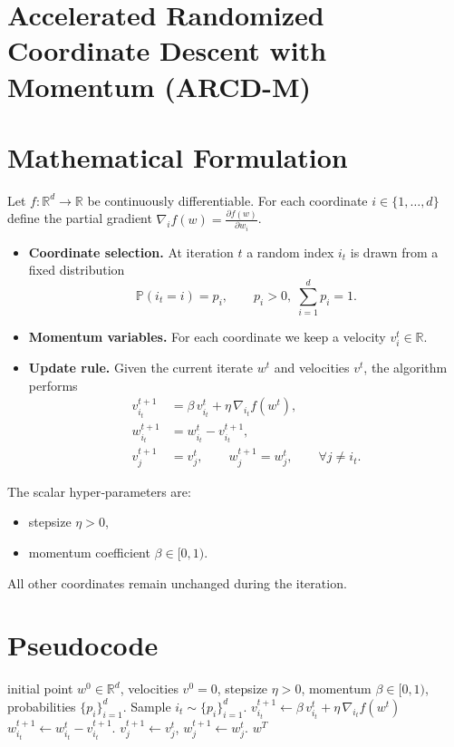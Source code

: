\documentclass{article}
\newcommand{\R}{\mathbb{R}}
\begin{document}
\section*{Accelerated Randomized Coordinate Descent with Momentum (ARCD-M)}

\section*{Mathematical Formulation}
Let $f:\R^{d}\rightarrow\R$ be continuously differentiable.  
For each coordinate $i\in\{1,\dots ,d\}$ define the partial gradient $\nabla_i f(w)=\frac{\partial f(w)}{\partial w_i}$.  

\begin{itemize}
    \item \textbf{Coordinate selection.} At iteration $t$ a random index $i_t$ is drawn from a fixed distribution 
    \[
        \mathbb{P}(i_t=i)=p_i,\qquad p_i>0,\;\sum_{i=1}^{d}p_i=1 .
    \]
    \item \textbf{Momentum variables.} For each coordinate we keep a velocity $v_i^t\in\R$.
    \item \textbf{Update rule.} Given the current iterate $w^t$ and velocities $v^t$, the algorithm performs
    \[
    \begin{aligned}
        v_{i_t}^{t+1}&=\beta\,v_{i_t}^{t}+ \eta\,\nabla_{i_t} f(w^{t}), \tag{1}\\
        w_{i_t}^{t+1}&= w_{i_t}^{t}- v_{i_t}^{t+1}, \tag{2}\\
        v_{j}^{t+1}&=v_{j}^{t},\qquad w_{j}^{t+1}=w_{j}^{t},\qquad \forall j\neq i_t . \tag{3}
    \end{aligned}
    \]
\end{itemize}
The scalar hyper‑parameters are:
\begin{itemize}
    \item stepsize $\eta>0$,
    \item momentum coefficient $\beta\in[0,1)$.
\end{itemize}
All other coordinates remain unchanged during the iteration.

\section*{Pseudocode}
\begin{algorithm}[H]
\caption{Accelerated Randomized Coordinate Descent with Momentum (ARCD-M)}
\begin{algorithmic}[1]
\REQUIRE initial point $w^{0}\in\R^{d}$, velocities $v^{0}=0$, stepsize $\eta>0$, momentum $\beta\in[0,1)$, probabilities $\{p_i\}_{i=1}^{d}$.
    \STATE Sample $i_t\sim\{p_i\}_{i=1}^{d}$.
    \STATE $v_{i_t}^{t+1}\gets \beta\,v_{i_t}^{t}+ \eta\,\nabla_{i_t}f(w^{t})$ \hfill {}
    \STATE $w_{i_t}^{t+1}\gets w_{i_t}^{t}-v_{i_t}^{t+1}$.
        \STATE $v_{j}^{t+1}\gets v_{j}^{t}$, \; $w_{j}^{t+1}\gets w_{j}^{t}$.
    \ENDFOR
\ENDFOR
\RETURN $w^{T}$
\end{algorithmic}
\end{algorithm}
\end{document}
